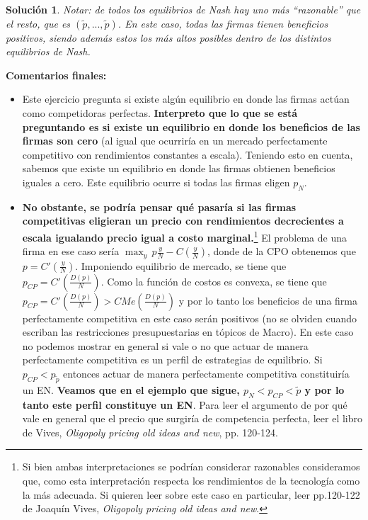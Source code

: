 \documentclass[a4paper, 11pt]{article}
\theoremstyle{definition}
\newtheorem{solucion}{Soluci\'on}
\newcommand{\p}[1]{\left(#1\right)}
\begin{document}
\begin{solucion}
\textit{Notar: de todos los equilibrios de Nash hay uno más ``razonable'' que el resto, que es $(\widetilde{p},...,\widetilde{p})$. En este caso, todas las firmas tienen beneficios positivos, siendo además estos los más altos posibles dentro de los distintos equilibrios de Nash.}

\textbf{Comentarios finales:} 
\begin{itemize}
\item Este ejercicio pregunta si existe algún equilibrio en donde las firmas actúan como competidoras perfectas. \textbf{Interpreto que lo que se está preguntando es si existe un equilibrio en donde los beneficios de las firmas son cero} (al igual que ocurriría en un mercado perfectamente competitivo con rendimientos constantes a escala). Teniendo esto en cuenta, sabemos que existe un equilibrio en donde las firmas obtienen beneficios iguales a cero. Este equilibrio ocurre si todas las firmas eligen $p_N$.
\item \textbf{No obstante, se podría pensar qué pasaría si las firmas competitivas eligieran un precio con rendimientos decrecientes a escala igualando precio igual a costo marginal.}\footnote{Si bien ambas interpretaciones se podrían considerar razonables consideramos que, como esta interpretación respecta los rendimientos de la tecnología como la más adecuada. Si quieren leer sobre este caso en particular, leer pp.120-122 de Joaquín Vives, \textit{Oligopoly pricing old ideas and new}.} El problema de una firma en ese caso sería $\displaystyle\max_{y}\, p\frac{y}{N}-C\p{\frac{y}{N}}$, donde de la CPO obtenemos que $p=C'\p{\frac{y}{N}}$. Imponiendo equilibrio de mercado, se tiene que $p_{CP}=C'\p{\frac{D(p)}{N}}$. Como la función de costos es convexa, se tiene que $p_{CP}=C'\p{\frac{D(p)}{N}}>CMe\p{\frac{D(p)}{N}}$ y por lo tanto los beneficios de una firma perfectamente competitiva en este caso serán positivos (no se olviden cuando escriban las restricciones presupuestarias en tópicos de Macro). En este caso no podemos mostrar en general si vale o no que actuar de manera perfectamente competitiva es un perfil de estrategias de equilibrio. Si $p_{CP}<p_{\tilde{p}}$ entonces actuar de manera perfectamente competitiva constituiría un EN. \textbf{Veamos que en el ejemplo que sigue, $p_N<p_{CP}<\tilde{p}$ y por lo tanto este perfil constituye un EN}. Para leer el argumento de por qué vale en general que el precio que surgiría de competencia perfecta, leer el libro de Vives, \textit{Oligopoly pricing old ideas and new}, pp. 120-124.
\end{itemize}


\end{solucion}
\end{document}
